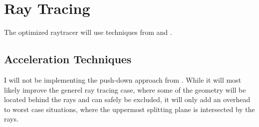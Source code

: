\chapter{Ray Tracing}





The optimized raytracer will use techniques from 
and .



\section{Acceleration Techniques}


I will not be implementing the push-down approach from
. While it will most likely improve the generel ray
tracing case, where some of the geometry will be located behind the
rays and can safely be excluded, it will only add an overhead to worst
case situations, where the uppermost splitting plane is intersected by
the rays.






